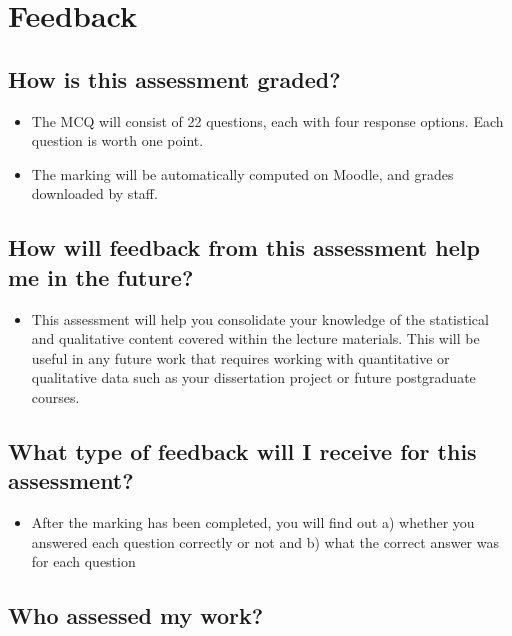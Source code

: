 \documentclass[
  english,
  letterpaper,
  DIV=11,
  numbers=noendperiod]{scrreprt}
\providecommand{\tightlist}{%
  \setlength{\itemsep}{0pt}\setlength{\parskip}{0pt}}
\begin{document}
\section{Feedback}\label{MCQ_feedback}

\subsection{How is this assessment
graded?}\label{how-is-this-assessment-graded-1}

\begin{itemize}
\item
  The MCQ will consist of 22 questions, each with four response options.
  Each question is worth one point.
\item
  The marking will be automatically computed on Moodle, and grades
  downloaded by staff.
\end{itemize}

\subsection{How will feedback from this assessment help me in the
future?}\label{how-will-feedback-from-this-assessment-help-me-in-the-future}

\begin{itemize}
\tightlist
\item
  This assessment will help you consolidate your knowledge of the
  statistical and qualitative content covered within the lecture
  materials. This will be useful in any future work that requires
  working with quantitative or qualitative data such as your
  dissertation project or future postgraduate courses.
\end{itemize}

\subsection{What type of feedback will I receive for this
assessment?}\label{what-type-of-feedback-will-i-receive-for-this-assessment}

\begin{itemize}
\tightlist
\item
  After the marking has been completed, you will find out a) whether you
  answered each question correctly or not and b) what the correct answer
  was for each question
\end{itemize}

\subsection{Who assessed my work?}\label{who-assessed-my-work-1}
\end{document}

